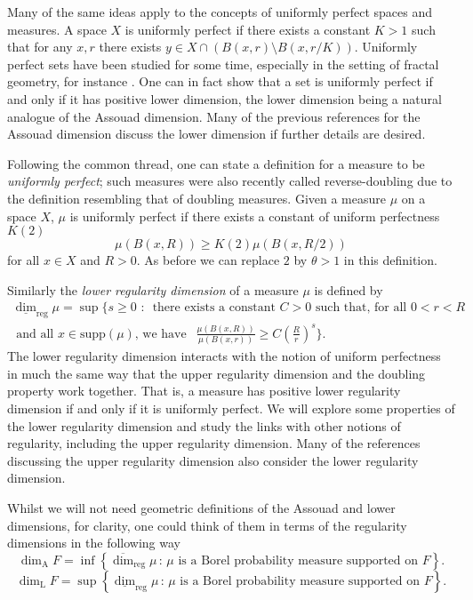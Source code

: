 \documentclass[12pt]{amsart}
\numberwithin{equation}{section}
\renewcommand{\ge}{\geqslant}
\renewcommand{\geq}{\geqslant}
\begin{document}
Many of the same ideas apply to the concepts of uniformly perfect spaces and measures. A space $X$ is uniformly perfect if there exists a constant $K>1$ such that for any $x,r$ there exists $y \in X \cap( B(x,r) \setminus B(x,r/K))$. Uniformly perfect sets have been studied for some time, especially in the setting of fractal geometry, for instance \cite{need refs here}. One can in fact show that a set is uniformly perfect if and only if it has positive lower dimension, the lower dimension being a natural analogue of the Assouad dimension. Many of the previous references for the Assouad dimension discuss the lower dimension if further details are desired.

Following the common thread, one can state a definition for a measure to be \textit{uniformly perfect}; such measures were also recently called reverse-doubling due to the definition resembling that of doubling measures. Given a measure $\mu$ on a space $X$, $\mu$ is uniformly perfect if there exists a constant of uniform perfectness $K(2)$
\[
\mu(B(x,R)) \ge K(2) \mu(B(x,R/2))
\]
for all $x\in X$ and $R > 0$. As before we can replace $2$ by $\theta > 1$ in this definition. 

Similarly the \textit{lower regularity dimension} of a measure $\mu$ is defined by 
\begin{multline*} 
\underline{\dim}_{\text{reg}} \mu = \sup \Bigg\{ s \geq 0 \, \,  : \,  \text{ there exists a  constant }C  > 0\text{  such that, for all  $0< r< R $} \\ \text{  and all $x \in \text{supp} (\mu)$, we have }  \ \  \frac{\mu(B(x,R))}{\mu(B(x,r))} \geq C\left(\frac{R}{r}\right)^{s} \Bigg\}.
\end{multline*}
The lower regularity dimension interacts with the notion of uniform perfectness in much the same way that the upper regularity dimension and the doubling property work together. That is, a measure has positive lower regularity dimension if and only if it is uniformly perfect. We will explore some properties of the lower regularity dimension and study the links with other notions of regularity, including the upper regularity dimension. Many of the references discussing the upper regularity dimension also consider the lower regularity dimension.

Whilst we will not need geometric definitions of the Assouad and lower dimensions, for clarity, one could think of them in terms of the regularity dimensions in the following way
\[
\dim_{\text{A}} F = \inf \left\{ \overline{\dim}_{\text{reg}} \mu \,  \colon \, \mu \text{ is a Borel probability measure supported on } F\right\}.
\]
\[
\dim_{\text{L}} F = \sup \left\{ \underline{\dim}_{\text{reg}} \mu \,  \colon \, \mu \text{ is a Borel probability measure supported on } F\right\}.
\]
\end{document}
